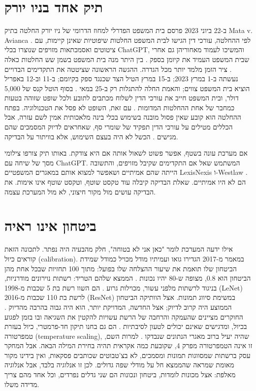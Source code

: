 \section{תיק אחד בניו יורק}
ב-22 ביוני 2023 פרסם בית המשפט הפדרלי למחוז הדרומי של ניו יורק החלטה בתיק Mata v. Avianca \cite{S-ch06-13}. לפי ההחלטה, עורכי דין הגישו לבית המשפט החלטות שיפוטיות שאינן קיימות, עם ציטוטים ואסמכתאות מזויפים שנוצרו בכלי ChatGPT, והמשיכו לעמוד מאחוריהן גם אחרי שבית המשפט העמיד את קיומן בספק \cite{S-ch06-13}. בין היתר מנה בית המשפט בשמן שש החלטות כאלה \cite{S-ch06-13}.
ציר הזמן מלמד יותר מכל הגדרה. ההגשה הראשונה שציטטה את התקדימים הבדויים נעשתה ב-1 במרץ 2023; ב-15 במרץ הטיל הצד שכנגד ספק בקיומם; ב-11 וב-12 באפריל הוציא בית המשפט צווים; והאמת החלה להתגלות רק ב-25 במאי \cite{S-ch06-13}. בסוף הוטל קנס של 5,000 דולר, ובית המשפט חייב את עורכי הדין לשלוח מכתבים לתובע ולכל שופט שזוהה בטעות כמחבר של אחת ההחלטות המדומות \cite{S-ch06-13}.
עם זאת, השופט לא פסל את הטכנולוגיה. בפתח ההחלטה הוא קובע שאין פסול מובנה בשימוש בכלי בינה מלאכותית אמין לשם עזרה, אבל הכללים מטילים על עורכי הדין תפקיד של שומרי סף, שאחראים לדיוק המסמכים שהם מגישים \cite{S-ch06-13}. הכשל לא היה בעצם השימוש, אלא בוויתור על הבדיקה.
\begin{mythbox}
\mythlabel אם מערכת עונה בשטף, אפשר פשוט לשאול אותה אם היא צודקת.
\tcblower
\realitylabel באותו תיק צורפו צילומי מסך של שיחה עם ChatGPT. המשתמש שאל אם התקדימים שקיבל מזויפים, והתשובה הייתה שהם אמיתיים ושאפשר למצוא אותם במאגרים המשפטיים LexisNexis ו-Westlaw \cite{S-ch06-13}. הם לא היו אמיתיים. שאלת הבדיקה קיבלה עוד טקסט שוטף, וטקסט שוטף אינו אימות. את הבדיקה עושים מול מקור חיצוני, לא מול המערכת עצמה.
\end{mythbox}
\section{ביטחון אינו ראיה}
אילו ידעה המערכת לומר "כאן אני לא בטוחה", חלק מהבעיה היה נפתר. לתכונה הזאת קוראים כיול (calibration). במאמר מ-2017 הגדירו גואו ועמיתיו מודל מכויל כמודל שמידת הביטחון שלו תואמת את שיעור ההצלחה שלו בפועל: מתוך 100 תחזיות שבכל אחת מהן הביטחון הוא 0.8, מצופה ש-80 יהיו נכונות \cite{S-ch06-05}.
הממצא שלהם הטריד: רשתות נוירונים מודרניות, בניגוד לרשתות מלפני עשור, מכוילות גרוע \cite{S-ch06-04}. הם השוו רשת בת 5 שכבות מ-1998 (LeNet) לרשת בת 110 שכבות מ-2016 (ResNet) במשימת סיווג תמונות. אצל הוותיקה הביטחון הממוצע היה קרוב לדיוק; אצל החדשה, המדויקת יותר, הוא היה גבוה בהרבה מהדיוק \cite{S-ch06-05}. החוקרים מציינים שהעמקה והרחבה של הרשת עשויות להקטין את השגיאה ובו בזמן לפגוע בכיול, ומדגישים שאינם יכולים לטעון לסיבתיות \cite{S-ch06-05}. הם גם בחנו תיקון חד-פרמטרי, כיול בעזרת טמפרטורה (temperature scaling), שהיה יעיל ברוב מאגרי הנתונים שנבדקו \cite{S-ch06-04}. למרות השם, זו אינה הטמפרטורה מפרק 4, שקובעת כמה אקראית תהיה בחירת המילה הבאה.
אבל המחקר עסק ברשתות שמסווגות תמונות ומסמכים, לא בצ'טבוטים שכותבים פסקאות, ואין בידינו מקור מאומת שמראה שהממצא חל על מודלי שפה גדולים. לכן זו אנלוגיה בלבד, אבל אנלוגיה מאלפת: אצל מכונות לומדות, ביטחון ונכונות הם שני גדלים נפרדים, וכל אחד מהם צריך מדידה משלו.
